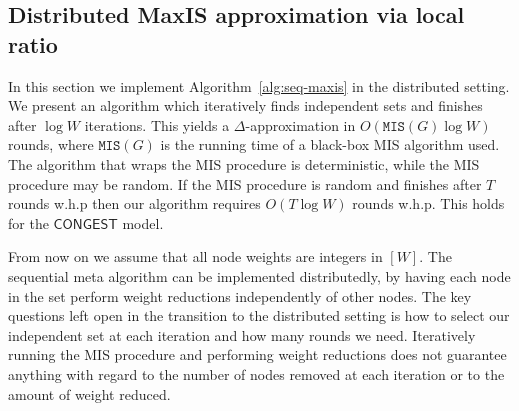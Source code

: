 \documentclass[11pt]{article}
\newcommand{\Wmax}{W}%
\newcommand{\MIS}{\texttt{MIS}(G)}
\begin{document}
\subsection{Distributed MaxIS approximation via local ratio}
\label{sec:distributedMaxIS}

In this section we implement Algorithm~\ref{alg:seq-maxis} in the distributed setting. We present an algorithm which iteratively finds independent sets and finishes after $\log \Wmax$ iterations. This yields a $\Delta$-approximation in $O(\MIS \log \Wmax)$ rounds, where $\MIS$ is the running time of a black-box MIS algorithm used. The algorithm that wraps the MIS procedure is deterministic, while the MIS procedure may be random. If the MIS procedure is random and finishes after $T$ rounds w.h.p then our algorithm requires $O(T\log \Wmax)$ rounds w.h.p. This holds for the $\mathsf{CONGEST}$ model. 

From now on we assume that all node weights are integers in $[\Wmax]$.
The sequential meta algorithm can be implemented distributedly, by having each node in the set perform weight reductions independently of other nodes. The key questions left open in the transition to the distributed setting is how to select our independent set at each iteration and how many rounds we need. Iteratively running the MIS procedure and performing weight reductions does not guarantee anything with regard to the number of nodes removed at each iteration or to the amount of weight reduced.
\end{document}
